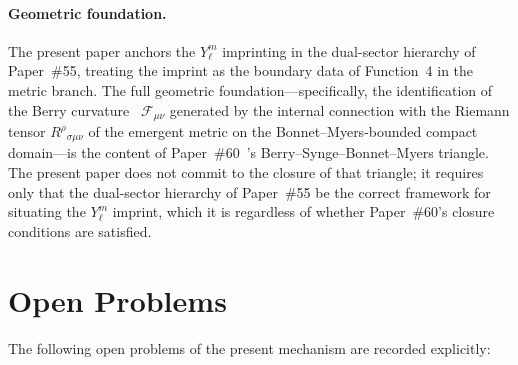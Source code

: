 \documentclass[%
 reprint, amsmath,amssymb, aps, prb, ]{revtex4-2}
\numberwithin{equation}{section}
\begin{document}
\paragraph{Geometric foundation.}
The present paper anchors the $Y_\ell^m$ imprinting in the dual-sector hierarchy of Paper~\#55, treating the imprint as the boundary data of Function~4 in the metric branch. The full geometric foundation---specifically, the identification of the Berry curvature~\cite{berry1984} $\mathcal{F}_{\mu\nu}$ generated by the internal connection with the Riemann tensor $R^\rho{}_{\sigma\mu\nu}$ of the emergent metric on the Bonnet--Myers-bounded compact domain---is the content of Paper~\#60~\cite{hanamura60}'s Berry--Synge--Bonnet--Myers triangle. The present paper does not commit to the closure of that triangle; it requires only that the dual-sector hierarchy of Paper~\#55 be the correct framework for situating the $Y_\ell^m$ imprint, which it is regardless of whether Paper~\#60's closure conditions are satisfied.

\section{Open Problems}
\label{sec:open}

The following open problems of the present mechanism are recorded explicitly:
\end{document}
